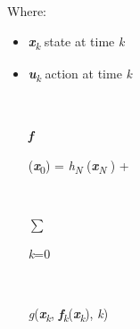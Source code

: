 \documentclass[12pt,twoside]{article}
\begin{document}
\begin{multicols}{4}

\vspace{\baselineskip}

\vspace{\baselineskip}
{\fontsize{10pt}{12.0pt}\selectfont Where:\par}\par


\vspace{\baselineskip}
\begin{itemize}
	\item {\fontsize{10pt}{12.0pt}\selectfont \textbf{\textit{x}}\textit{\textsubscript{k} }state at time \textit{k}\par}\par

	\item {\fontsize{10pt}{12.0pt}\selectfont \textbf{\textit{u}}\textit{\textsubscript{k} }action at time \textit{k}\par}\par

\begin{FlushLeft}
\\
{\fontsize{7pt}{8.4pt}\selectfont \textbf{\textit{f }}{\fontsize{10pt}{12.0pt}\selectfont (\textbf{\textit{x}}\textsubscript{0}) = \textit{h\textsubscript{N} }(\textbf{\textit{x}}\textit{\textsubscript{N} }) +\par}\par}
\end{FlushLeft}\par

\begin{FlushLeft}
\\
{\fontsize{14pt}{16.8pt}\selectfont $ \sum $ \par}
\end{FlushLeft}\par

\begin{FlushLeft}
{\fontsize{7pt}{8.4pt}\selectfont \textit{k}=0\par}
\end{FlushLeft}\par

\begin{FlushLeft}
\\
{\fontsize{10pt}{12.0pt}\selectfont \textit{g}(\textbf{\textit{x}}\textit{\textsubscript{k}}, \textbf{\textit{f}}\textit{\textsubscript{k}}(\textbf{\textit{x}}\textit{\textsubscript{k}}), \textit{k})\par}
\end{FlushLeft}\par


\vspace{\baselineskip}

\end{itemize}
\end{multicols}
\end{document}
